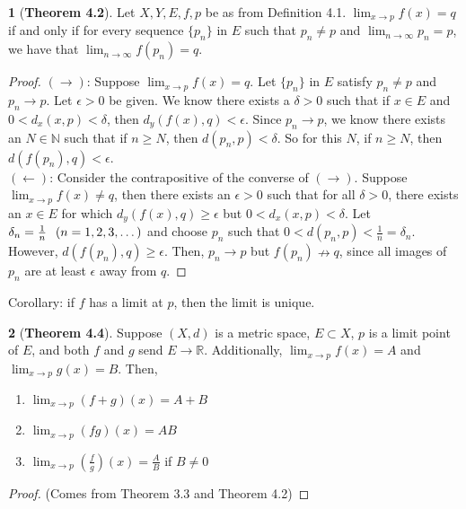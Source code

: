 \documentclass[12pt]{article}
\theoremstyle{definition}
\theoremstyle{named}
\newtheorem{theorem}{}
\begin{document}
\begin{theorem}[\textbf{Theorem 4.2}]
    Let $X, Y, E, f, p$ be as from Definition 4.1. $\lim_{x \to p} f(x) = q$ if and only if for every sequence $\{p_n\}$ in $E$ such that $p_n \neq p$ and $\lim_{n \to \infty} p_n = p$, we have that $\lim_{n \to \infty} f(p_n) = q$. 
\end{theorem}
\begin{proof}
    $(\rightarrow)$: Suppose $\lim_{x \to p} f(x) = q$. Let $\{p_n\}$ in $E$ satisfy $p_n \neq p$ and $p_n \to p$. Let $\epsilon > 0$ be given. We know there exists a $\delta > 0$ such that if $x \in E$ and $0 < d_x(x,p) < \delta$, then $d_y(f(x),q) < \epsilon$. Since $p_n \to p$, we know there exists an $N \in \mathbb{N}$ such that if $n \geq N$, then $d(p_n, p) < \delta$. So for this $N$, if $n \geq N$, then $d(f(p_n), q) < \epsilon$. \\
    $(\leftarrow)$: Consider the contrapositive of the converse of $(\rightarrow)$. Suppose $\lim_{x \to p} f(x) \neq q$, then there exists an $\epsilon > 0$ such that for all $\delta > 0$, there exists an $x \in E$ for which $d_y(f(x), q) \geq \epsilon$ but $0 < d_x(x,p) < \delta$. Let $\delta_n = \frac{1}{n} \hspace{0.25cm} (n=1,2,3, \dots)$ and choose $p_n$ such that $0 < d(p_n, p) < \frac{1}{n} = \delta_n$. However, $d(f(p_n), q) \geq \epsilon$. Then, $p_n \to p$ but $f(p_n) \nrightarrow q$, since all images of $p_n$ are at least $\epsilon$ away from $q$. 
\end{proof}

Corollary: if $f$ has a limit at $p$, then the limit is unique. 

\begin{theorem}[\textbf{Theorem 4.4}]
Suppose $(X,d)$ is a metric space, $E \subset X$, $p$ is a limit point of $E$, and both $f$ and $g$ send $E \to \mathbb{R}$. Additionally, $\lim_{x \to p} f(x) = A$ and $\lim_{x \to p} g(x) = B$. Then, 
\begin{enumerate}
    \item $\lim_{x \to p} (f+g)(x) = A + B$
    \item $\lim_{x \to p} (fg)(x) = AB$
    \item $\lim_{x \to p} \left(\frac{f}{g}\right)(x) = \frac{A}{B}$ if $B \neq 0$
\end{enumerate}
\end{theorem}
\begin{proof}
    (Comes from Theorem 3.3 and Theorem 4.2) 
\end{proof}
\end{document}
